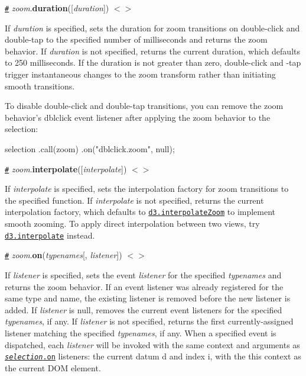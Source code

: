 \href{#zoom_duration}{\tt \#} {\itshape zoom}.{\bfseries duration}(\mbox{[}{\itshape duration}\mbox{]}) \href{https://github.com/d3/d3-zoom/blob/master/src/zoom.js#L406}{\tt $<$$>$}

If {\itshape duration} is specified, sets the duration for zoom transitions on double-\/click and double-\/tap to the specified number of milliseconds and returns the zoom behavior. If {\itshape duration} is not specified, returns the current duration, which defaults to 250 milliseconds. If the duration is not greater than zero, double-\/click and -\/tap trigger instantaneous changes to the zoom transform rather than initiating smooth transitions.

To disable double-\/click and double-\/tap transitions, you can remove the zoom behavior’s dblclick event listener after applying the zoom behavior to the selection\+:


\begin{DoxyCode}
selection
    .call(zoom)
    .on("dblclick.zoom", null);
\end{DoxyCode}


\href{#zoom_interpolate}{\tt \#} {\itshape zoom}.{\bfseries interpolate}(\mbox{[}{\itshape interpolate}\mbox{]}) \href{https://github.com/d3/d3-zoom/blob/master/src/zoom.js#L410}{\tt $<$$>$}

If {\itshape interpolate} is specified, sets the interpolation factory for zoom transitions to the specified function. If {\itshape interpolate} is not specified, returns the current interpolation factory, which defaults to \href{https://github.com/d3/d3-interpolate#interpolateZoom}{\tt d3.\+interpolate\+Zoom} to implement smooth zooming. To apply direct interpolation between two views, try \href{https://github.com/d3/d3-interpolate#interpolate}{\tt d3.\+interpolate} instead.

\href{#zoom_on}{\tt \#} {\itshape zoom}.{\bfseries on}({\itshape typenames}\mbox{[}, {\itshape listener}\mbox{]}) \href{https://github.com/d3/d3-zoom/blob/master/src/zoom.js#L414}{\tt $<$$>$}

If {\itshape listener} is specified, sets the event {\itshape listener} for the specified {\itshape typenames} and returns the zoom behavior. If an event listener was already registered for the same type and name, the existing listener is removed before the new listener is added. If {\itshape listener} is null, removes the current event listeners for the specified {\itshape typenames}, if any. If {\itshape listener} is not specified, returns the first currently-\/assigned listener matching the specified {\itshape typenames}, if any. When a specified event is dispatched, each {\itshape listener} will be invoked with the same context and arguments as \href{https://github.com/d3/d3-selection#selection_on}{\tt {\itshape selection}.on} listeners\+: the current datum {\ttfamily d} and index {\ttfamily i}, with the {\ttfamily this} context as the current D\+OM element.

